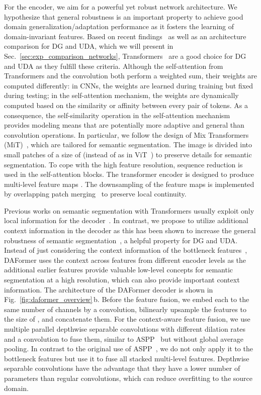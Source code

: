 \documentclass[journal,compsoc]{IEEEtran}
\begin{document}
For the encoder, we aim for a powerful yet robust network architecture. 
We hypothesize that general robustness is an important property to achieve good domain generalization/adaptation performance as it fosters the learning of domain-invariant features.
Based on recent findings~\cite{bhojanapalli2021understanding, naseer2021intriguing} as well as an architecture comparison for DG and UDA, which we will present in Sec.~\ref{sec:exp_comparison_networks}, Transformers~\cite{vaswani2017attention} are a good choice for DG and UDA as they fulfill these criteria. Although the self-attention from Transformers and the convolution both perform a weighted sum, their weights are computed differently: in CNNs, the weights are learned during training but fixed during testing; in the self-attention mechanism, the weights are dynamically computed based on the similarity or affinity between every pair of tokens. As a consequence, the self-similarity operation in the self-attention mechanism provides modeling means that are potentially more adaptive and general than convolution operations.
In particular, we follow the design of Mix Transformers (MiT)~\cite{xie2021segformer}, which are tailored for semantic segmentation. The image is divided into small patches of a size of   (instead of  as in ViT~\cite{dosovitskiy2020image}) to preserve details for semantic segmentation. To cope with the high feature resolution, sequence reduction is used in the self-attention blocks. The transformer encoder is designed to produce multi-level feature maps . The downsampling of the feature maps is implemented by overlapping patch merging~\cite{xie2021segformer} to preserve local continuity.

Previous works on semantic segmentation with Transformers usually exploit only local information for the decoder~\cite{xie2021segformer, zheng2021rethinking}.
In contrast, we propose to utilize additional context information in the decoder
as this has been shown to increase the general robustness of semantic segmentation~\cite{kamann2021benchmarking}, a helpful property for DG and UDA. Instead of just considering the context information of the bottleneck features~\cite{chen2017deeplab, chen2018encoder}, DAFormer uses the context across features from different encoder levels as the additional earlier features provide valuable low-level concepts for semantic segmentation at a high resolution, which can also provide important context information.
The architecture of the DAFormer decoder is shown in Fig.~\ref{fig:daformer_overview}\,b. Before the feature fusion, we embed each  to the same number of channels  by a  convolution, bilinearly upsample the features to the size of , and concatenate them. For the context-aware feature fusion, we use multiple parallel  depthwise separable convolutions with different dilation rates and a  convolution to fuse them, similar to ASPP~\cite{chen2018encoder} but without global average pooling. In contrast to the original use of ASPP~\cite{chen2018encoder}, we do not only apply it to the bottleneck features  but use it to fuse all stacked multi-level features. Depthwise separable convolutions have the advantage that they have a lower number of parameters than regular convolutions, which can reduce overfitting to the source domain.
\end{document}
